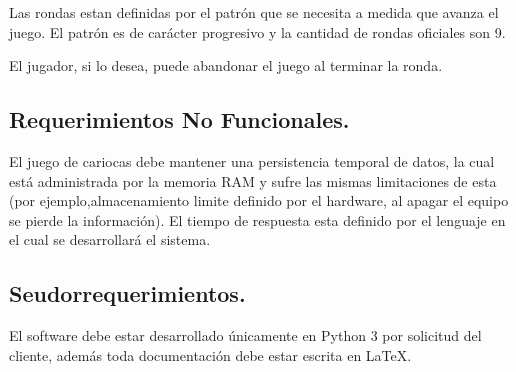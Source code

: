 Las rondas estan definidas por el patrón que se necesita a medida que avanza el juego. El patrón es de carácter progresivo y la cantidad de rondas oficiales son 9.

El jugador, si lo desea, puede abandonar el juego al terminar la ronda.
\subsection{Requerimientos No Funcionales.}\label{cap:requerimientos-no-funcionales}
El juego de cariocas debe mantener una persistencia temporal de datos, la cual está administrada por la memoria RAM y sufre las mismas limitaciones de esta (por ejemplo,almacenamiento limite definido por el hardware, al apagar el equipo se pierde la información).  El tiempo de respuesta esta definido por el lenguaje en el cual se desarrollará el sistema.

\subsection{Seudorrequerimientos.}\label{cap:seudorrequerimientos}
El software debe estar desarrollado únicamente en Python 3 por solicitud del cliente, además toda documentación debe estar escrita en LaTeX.
